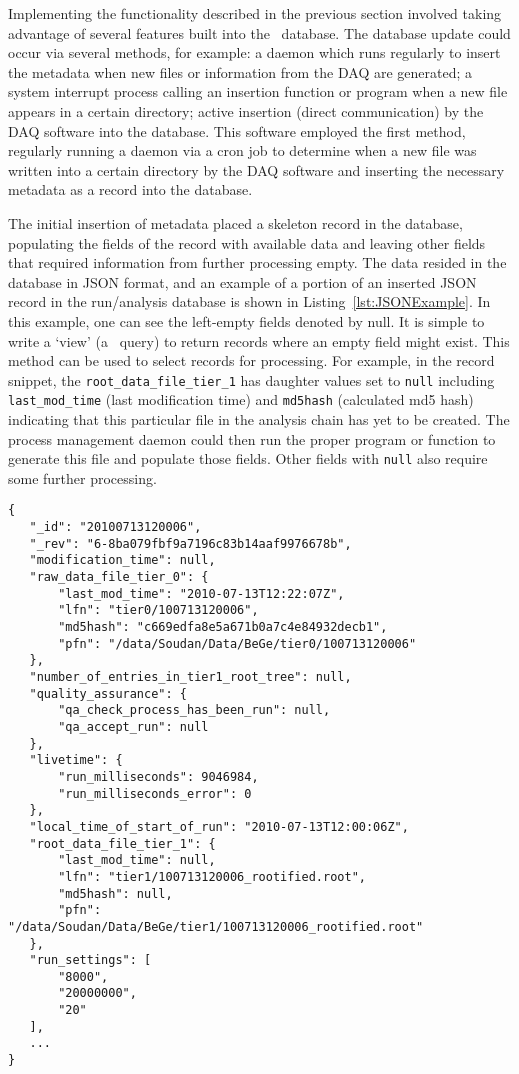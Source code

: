 	Implementing the functionality described in the previous section involved
taking advantage of several features built into the \couchdb~database.  The
database update could occur via several methods, for example: a daemon which
runs regularly to insert the metadata when new files or information from the
DAQ are generated; a system interrupt process calling an insertion function or
program when a new file appears in a certain directory; active insertion
(direct communication) by the DAQ software into the database.  This software
employed the first method, regularly running a daemon via a cron job to
determine when a new file was written into a certain directory by the DAQ
software and inserting the necessary metadata as a record into the database.  
	
	The initial insertion of metadata placed a skeleton record in the database,
populating the fields of the record with available data and leaving other
fields that required information from further processing empty.  The data
resided in the database in JSON format, and an example of a portion of an
inserted JSON record in the run/analysis database is shown in
Listing~\ref{lst:JSONExample}.  In this example, one can see the left-empty
fields denoted by {\ttfamily null}.  It is simple to write a `view' (a \couchdb~query) to return records where an empty field might exist.  This method can be
used to select records for processing.  For example, in the record snippet,
the \lstinline!root_data_file_tier_1! has daughter values set to
\lstinline!null! including \lstinline!last_mod_time! (last modification time)
and \lstinline!md5hash! (calculated md5 hash) indicating that this particular
file in the analysis chain has yet to be created.  The process management
daemon could then run the proper program or function to generate this file and
populate those fields.  Other fields with \lstinline!null! also require some
further processing.  
	

			\begin{lstlisting}[caption=Truncated example of a JSON record in the run/analysis database., label=lst:JSONExample]
{
   "_id": "20100713120006",
   "_rev": "6-8ba079fbf9a7196c83b14aaf9976678b",
   "modification_time": null,
   "raw_data_file_tier_0": {
       "last_mod_time": "2010-07-13T12:22:07Z",
       "lfn": "tier0/100713120006",
       "md5hash": "c669edfa8e5a671b0a7c4e84932decb1",
       "pfn": "/data/Soudan/Data/BeGe/tier0/100713120006"
   },
   "number_of_entries_in_tier1_root_tree": null,
   "quality_assurance": {
       "qa_check_process_has_been_run": null,
       "qa_accept_run": null
   },
   "livetime": {
       "run_milliseconds": 9046984,
       "run_milliseconds_error": 0
   },
   "local_time_of_start_of_run": "2010-07-13T12:00:06Z",
   "root_data_file_tier_1": {
       "last_mod_time": null,
       "lfn": "tier1/100713120006_rootified.root",
       "md5hash": null,
       "pfn": "/data/Soudan/Data/BeGe/tier1/100713120006_rootified.root"
   },
   "run_settings": [
       "8000",
       "20000000",
       "20"
   ],
   ...
}
			\end{lstlisting}	

